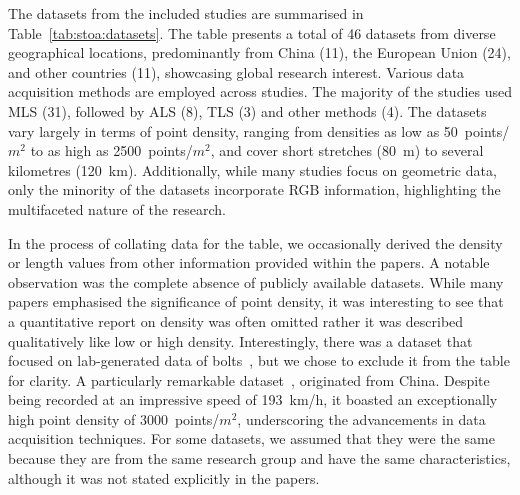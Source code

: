 The datasets from the included studies are summarised in Table~\ref{tab:stoa:datasets}. The table presents a total of 46 datasets from diverse geographical locations, predominantly from China (11), the European Union (24), and other countries (11), showcasing global research interest. Various data acquisition methods are employed across studies. The majority of the studies used MLS (31), followed by ALS (8), TLS (3) and other methods (4). The datasets vary largely in terms of point density, ranging from densities as low as 50~points/$m^2$ to as high as 2500~points/$m^2$, and cover short stretches (80~m) to several kilometres (120~km). Additionally, while many studies focus on geometric data, only the minority of the datasets incorporate RGB information, highlighting the multifaceted nature of the research.

In the process of collating data for the table, we occasionally derived the density or length values from other information provided within the papers. A notable observation was the complete absence of publicly available datasets. While many papers emphasised the significance of point density, it was interesting to see that a quantitative report on density was often omitted rather it was described qualitatively like low or high density. Interestingly, there was a dataset that focused on lab-generated data of bolts~\cite{lu2021bolt}, but we chose to exclude it from the table for clarity. A particularly remarkable dataset~\cite{zhang2016automatic}, originated from China. Despite being recorded at an impressive speed of 193~km/h, it boasted an exceptionally high point density of 3000~points/$m^2$, underscoring the advancements in data acquisition techniques. For some datasets, we assumed that they were the same because they are from the same research group and have the same characteristics, although it was not stated explicitly in the papers.
\setlength{\tabcolsep}{2pt}
